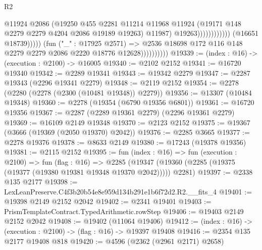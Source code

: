 \begin{lexlean}{R2}
\begin{coremodule}
                                                      @11924
                                                      @2086
                                                      (@19250
                                                        @455
                                                        @2281
                                                        @11214
                                                        @11968
                                                        @11924
                                                        (@19171
                                                          @148
                                                          @2279
                                                          @2279
                                                          @4204
                                                          @2086
                                                          @19189
                                                          @19263)
                                                        @11987)
                                                      @19263))))))))))))
                              (@16651 @18739)))))
                      (fun ("_" : @17925 @2571) =>
                      @2536 @18698 @172 @116 @148 @2279 @2279 @2086 @2220 @18776 @12628))))))))))
@19339 := (index : @16) -> (execution : @2100) -> @16005
@19340 := @2102 @2152
@19341 := @16720 @19340
@19342 := @2289 @19341
@19343 := @19342 @2279
@19347 := @2287 @19343 (@2296 @19341 @2279)
@19348 := @2119 @2152
@19354 := @2278 (@2280 (@2278 (@2300 (@10481 @19348)) @2279))
@19356 := @13307 (@10484 @19348)
@19360 := @2278 (@19354 (@6790 @19356 @6801))
@19361 := @16720 @19356
@19367 := @2287 (@2289 @19361 @2279) (@2296 @19361 @2279)
@19369 := @16109 @2149 @19348
@19370 := @2123 @2152
@19375 := @19367 (@3666 (@19369 (@2050 @19370) @2042))
@19376 := @2285 @3665
@19377 := @2278 @19376
@19378 := @8633 @2149
@19380 := @17243 (@19378 @19356)
@19381 := @2115 @2152
@19395 := fun (index : @16) =>
  fun (execution : @2100) =>
  fun (flag : @16) =>
  @2285 (@19347 (@19360 (@2285 (@19375 (@19377 (@19380 @19381 @19348 @19370 @2042))))) @2281)
@19397 := @2338 @135 @2177
@19398 := LexLeanPreserve.C4f3b20b54e8e959d134b291e1b6f72d2.R2.__fits_4
@19401 := @19398 @2149 @2152 @2042
@19402 := @2341 @19401
@19403 := PrismTemplateContract.TypedArithmetic.rowStep
@19406 := @19403 @2149 @2152 @2042
@19408 := @19402 (@11064 @19406)
@19412 := (index : @16) -> (execution : @2100) -> (flag : @16) -> @19397 @19408
@19416 := @2354 @135 @2177 @19408 @818
@19420 := @4596 (@2362 (@2961 @2171) @2658)

\end{coremodule}
\end{lexlean}
